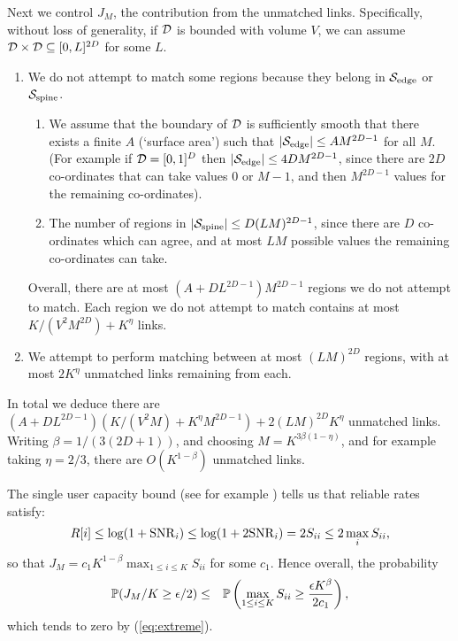\documentclass[journal]{IEEEtran}
\begin{document}
\begin{IEEEproof}
Next we control $J_M$, the contribution from the unmatched links. Specifically, without loss of generality, 
if ${\mathcal{D}}$ is bounded with volume $V$, 
we can assume ${\mathcal{D}} \times {\mathcal{D}}  \subseteq [0,L]^{2D}$ for some $L$.
\begin{enumerate}
\item
 We do not attempt
to match some regions because
they belong in ${\mathcal{S}}_{\rm edge}$ or ${\mathcal{S}}_{\rm spine}$. 
%
\begin{enumerate}
\item We assume that the boundary of ${\mathcal{D}}$ is sufficiently smooth that there exists a finite
$A$ (`surface area') such that
$|{\mathcal{S}}_{\rm edge}| \leq A M^{2D-1}$  for all $M$. (For example if ${\mathcal{D}} = [0,1]^D$ then
$|{\mathcal{S}}_{\rm edge}| \leq 4D M^{2D-1}$, since there are $2D$ co-ordinates that can take values $0$ or
$M-1$,
and then $M^{2D-1}$ values for the remaining co-ordinates).
\item
The number of regions in $|{\mathcal{S}}_{\rm spine}| \leq D (LM)^{2D-1}$, since there
are $D$ co-ordinates which can agree, and at most $LM$ possible values the remaining
co-ordinates can take. 
\end{enumerate}
Overall, there are at most $(A + D L^{2D-1}) M^{2D-1}$ regions we do not attempt to match.
Each region we do not attempt to match contains
at most $K/(V^2 M^{2D}) + K^{\eta}$ links.
\item
We attempt to perform matching between at most
$(LM)^{2D}$ regions, with at most $2 K^{\eta}$ unmatched links
remaining from each.
\end{enumerate}
In total we deduce 
there are $(A + D L^{2D-1})(K/(V^2 M) + K^{\eta} M^{2D-1})
+ 2 (LM)^{2D} K^{\eta}$ unmatched links. Writing $\beta =
1/(3(2D+1))$, and
choosing $M = K^{3 \beta(1-\eta)}$, and for example taking $\eta = 2/3$, there are 
$O \left(K^ {1 - \beta} \right)$ unmatched links.

The single user capacity bound (see for example  \cite[Equation (6.4)]{tse})
tells us that reliable rates satisfy:
\begin{equation} \label{eq:single}
R[i] \leq \log( 1 + {\rm{SNR}}_i) \leq \log(1 + 2 {\rm{SNR}}_i) = 2 S_{ii} \leq 2 \max_i
S_{ii},\end{equation}
so that $J_M = c_1 K^{1-\beta} \max_{1 \leq i \leq K} S_{ii}$ for some $c_1$.
Hence overall, the probability
\begin{eqnarray*}
{\mathbb {P}}( J_M/K \geq \epsilon/2)
& \leq & {\mathbb {P}} \left(  \max_{1 \leq i \leq K} S_{ii} \geq  \frac{\epsilon K^{\beta}}{2 c_1} \right),
\end{eqnarray*}
which tends
to zero by  (\ref{eq:extreme}).
\end{IEEEproof}
\end{document}
